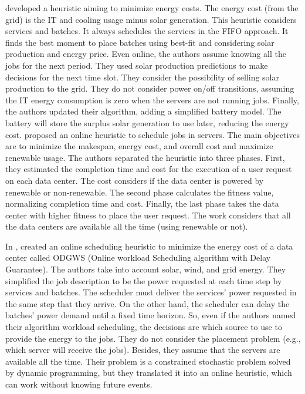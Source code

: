 \citeauthor{haghshenas2020infrastructure} \cite{haghshenas2020infrastructure} developed a heuristic aiming to minimize energy costs. The energy cost (from the grid) is the IT and cooling usage minus solar generation. This heuristic considers services and batches. It always schedules the services in the FIFO approach. It finds the best moment to place batches using best-fit and considering solar production and energy price. Even online, the authors assume knowing all the jobs for the next period. They used solar production predictions to make decisions for the next time slot. They consider the possibility of selling solar production to the grid. They do not consider power on/off transitions, assuming the IT energy consumption is zero when the servers are not running jobs. Finally, the authors updated their algorithm, adding a simplified battery model. The battery will store the surplus solar generation to use later, reducing the energy cost. \cite{nayak2021efficient} proposed an online heuristic to schedule jobs in servers. The main objectives are to minimize the makespan, energy cost, and overall cost and maximize renewable usage. The authors separated the heuristic into three phases. First, they estimated the completion time and cost for the execution of a user request on each data center. The cost considers if the data center is powered by renewable or non-renewable. The second phase calculates the fitness value, normalizing completion time and cost. Finally, the last phase takes the data center with higher fitness to place the user request. The work considers that all the data centers are available all the time (using renewable or not).

In \cite{he2022online}, \citeauthor{he2022online} created an online scheduling heuristic to minimize the energy cost of a data center called ODGWS (Online workload Scheduling algorithm with Delay Guarantee). The authors take into account solar, wind, and grid energy. They simplified the job description to be the power requested at each time step by services and batches. The scheduler must deliver the services' power requested in the same step that they arrive. On the other hand, the scheduler can delay the batches' power demand until a fixed time horizon. So, even if the authors named their algorithm workload scheduling, the decisions are which source to use to provide the energy to the jobs. They do not consider the placement problem (e.g., which server will receive the jobs). Besides, they assume that the servers are available all the time. Their problem is a constrained stochastic problem solved by dynamic programming, but they translated it into an online heuristic, which can work without knowing future events.

